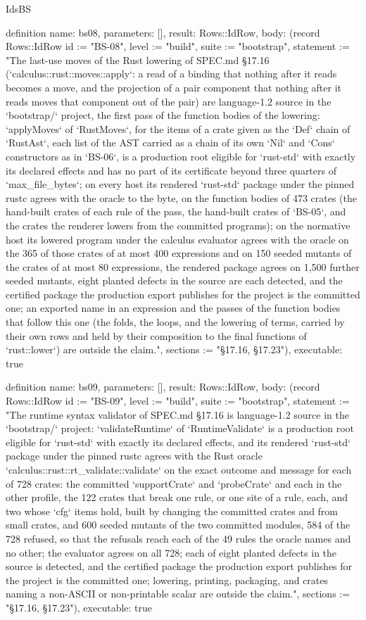 \begin{lexlean}{IdsBS}
\begin{semanticmodule}
definition{
  name: bs08,
  parameters: [],
  result: Rows::IdRow,
  body: (record Rows::IdRow {id := "BS-08", level := "build", suite := "bootstrap", statement := "The last-use moves of the Rust lowering of SPEC.md §17.16 (`calculus::rust::moves::apply`: a read of a binding that nothing after it reads becomes a move, and the projection of a pair component that nothing after it reads moves that component out of the pair) are language-1.2 source in the `bootstrap/` project, the first pass of the function bodies of the lowering: `applyMoves` of `RustMoves`, for the items of a crate given as the `Def` chain of `RustAst`, each list of the AST carried as a chain of its own `Nil` and `Cons` constructors as in `BS-06`, is a production root eligible for `rust-std` with exactly its declared effects and has no part of its certificate beyond three quarters of `max_file_bytes`; on every host its rendered `rust-std` package under the pinned rustc agrees with the oracle to the byte, on the function bodies of 473 crates (the hand-built crates of each rule of the pass, the hand-built crates of `BS-05`, and the crates the renderer lowers from the committed programs); on the normative host its lowered program under the calculus evaluator agrees with the oracle on the 365 of those crates of at most 400 expressions and on 150 seeded mutants of the crates of at most 80 expressions, the rendered package agrees on 1,500 further seeded mutants, eight planted defects in the source are each detected, and the certified package the production export publishes for the project is the committed one; an exported name in an expression and the passes of the function bodies that follow this one (the folds, the loops, and the lowering of terms, carried by their own rows and held by their composition to the final functions of `rust::lower`) are outside the claim.", sections := "§17.16, §17.23"}),
  executable: true
}

definition{
  name: bs09,
  parameters: [],
  result: Rows::IdRow,
  body: (record Rows::IdRow {id := "BS-09", level := "build", suite := "bootstrap", statement := "The runtime syntax validator of SPEC.md §17.16 is language-1.2 source in the `bootstrap/` project: `validateRuntime` of `RuntimeValidate` is a production root eligible for `rust-std` with exactly its declared effects, and its rendered `rust-std` package under the pinned rustc agrees with the Rust oracle `calculus::rust::rt_validate::validate` on the exact outcome and message for each of 728 crates: the committed `supportCrate` and `probeCrate` and each in the other profile, the 122 crates that break one rule, or one site of a rule, each, and two whose `cfg` items hold, built by changing the committed crates and from small crates, and 600 seeded mutants of the two committed modules, 584 of the 728 refused, so that the refusals reach each of the 49 rules the oracle names and no other; the evaluator agrees on all 728; each of eight planted defects in the source is detected, and the certified package the production export publishes for the project is the committed one; lowering, printing, packaging, and crates naming a non-ASCII or non-printable scalar are outside the claim.", sections := "§17.16, §17.23"}),
  executable: true
}


\end{semanticmodule}
\end{lexlean}
